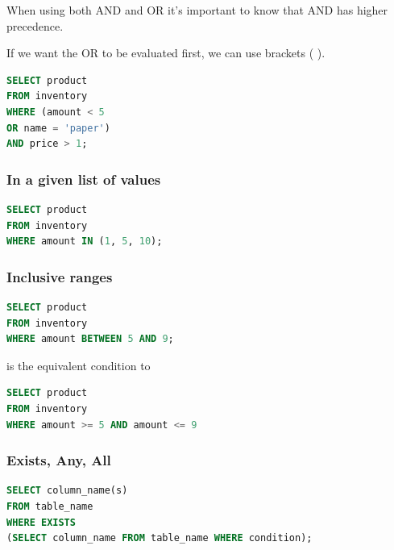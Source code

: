 \documentclass{article}
\begin{document}
When using both AND and OR it's important to know that AND has higher precedence.

If we want the OR to be evaluated first, we can use brackets ( ).

\vspace{8pt} \begin{lstlisting}[language=SQL]
SELECT product
FROM inventory
WHERE (amount < 5
OR name = 'paper')
AND price > 1;
\end{lstlisting} \vspace{8pt}

\subsubsection{In a given list of values}

\vspace{8pt} \begin{lstlisting}[language=SQL]
SELECT product
FROM inventory
WHERE amount IN (1, 5, 10);
\end{lstlisting} \vspace{8pt}

\subsubsection{Inclusive ranges}

\vspace{8pt} \begin{lstlisting}[language=SQL]
SELECT product
FROM inventory
WHERE amount BETWEEN 5 AND 9;
\end{lstlisting} \vspace{8pt}

is the equivalent condition to

\vspace{8pt} \begin{lstlisting}[language=SQL]
SELECT product
FROM inventory
WHERE amount >= 5 AND amount <= 9
\end{lstlisting} \vspace{8pt}

\subsubsection{Exists, Any, All}

\vspace{8pt} \begin{lstlisting}[language=SQL]
SELECT column_name(s)
FROM table_name
WHERE EXISTS
(SELECT column_name FROM table_name WHERE condition);
\end{lstlisting} \vspace{8pt}
\end{document}
